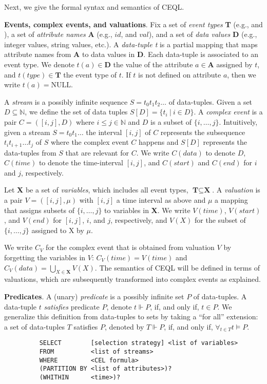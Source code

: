 Next, we give the formal syntax and semantics of CEQL.

\textbf{Events, complex events, and valuations}. Fix a set of \emph{event types} \textbf{T} (e.g.,  and ), a set of \emph{attribute names} \textbf{A} (e.g., $id$, and $val$), and a set of \emph{data values} \textbf{D} (e.g., integer values, string values, etc.). A \emph{data-tuple t} is a partial mapping that maps attribute names from \textbf{A} to data values in \textbf{D}. Each data-tuple is associated to an event type. We denote $t(a) \in \textbf{D}$ the value of the attribute $a \in \textbf{A}$ assigned by $t$, and $t(type) \in \textbf{T}$ the event type of $t$. If $t$ is not defined on attribute $a$, then we write $t(a) = \text{NULL}$.

A \emph{stream} is a possibly infinite sequence $S = t_{0}t_{1}t_{2}\ldots$ of data-tuples. Given a set $D \subseteq \mathbb{N}$, we define the set of data tuples $S[D] = \{ t_{i} \ | \ i \in D\}$. A \emph{complex event} is a pair $C = ([i,j], D)$ where $i \le j \in \mathbb{N}$ and $D$ is a subset of $\{i, \ldots, j\}$. Intuitively, given a stream $S = t_{0}t_{1}\ldots$ the interval $[i, j]$ of $C$ represents the subsequence $t_{i}t_{i+1} \ldots t_{j}$ of $S$ where the complex event $C$ happens and $S[D]$ represents the data-tuples from $S$ that are relevant for $C$. We write $C(data)$ to denote $D$, $C(time)$ to denote the time-interval $[i, j]$, and $C(start)$ and $C(end)$ for $i$ and $j$, respectively.

Let \textbf{X} be a set of \emph{variables}, which includes all event types, $\textbf{T} \subseteq \textbf{X}$. A \emph{valuation} is a pair $V = ([i, j], \mu)$ with $[i,j]$ a time interval as above and $\mu$ a mapping that assigns subsets of $\{i, \ldots, j\}$ to variables in \textbf{X}. We write $V(time)$, $V(start)$, and $V(end)$ for $[i,j]$, $i$, and $j$, respectively, and $V(X)$ for the subset of $\{i,\ldots, j\}$ assigned to X by $\mu$.

We write $C_{V}$ for the complex event that is obtained from valuation $V$ by forgetting the variables in $V$: $C_{V}(time) = V(time)$ and $C_{V}(data) = \bigcup\limits_{X \in \textbf{X}} V(X)$. The semantics of CEQL will be defined in terms of valuations, which are subsequently transformed into complex events as explained.

\textbf{Predicates}. A (unary) \emph{predicate} is a possibly infinite set $P$ of data-tuples. A data-tuple $t$ \emph{satisfies} predicate $P$, denote $t \Vdash P$, if, and only if, $t \in P$. We generalize this definition from data-tuples to sets by taking a ``for all'' extension: a set of data-tuples $T$ satisfies $P$, denoted by $T \Vdash P$, if, and only if, $\displaystyle\mathop{\forall}_{t \in T} t \vDash P$.
\begin{figure}[H]
  \begin{verbatim}
    SELECT        [selection strategy] <list of variables>
    FROM          <list of streams>
    WHERE         <CEL formula>
    (PARTITION BY <list of attributes>)?
    (WHITHIN      <time>)?
  \end{verbatim}
\end{figure}

